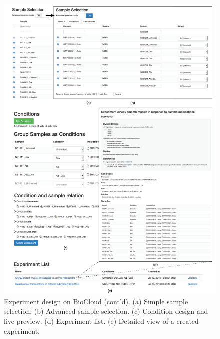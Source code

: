 \begin{figure}[!tbp]
\centering
\includegraphics[width=1\textwidth]{images/biocloud_experiment_sample_condition}
\caption[Experiment design on BioCloud (cont'd)]{
    Experiment design on BioCloud (cont'd).
    (a) Simple sample selection.
    (b) Advanced sample selection.
    (c) Condition design and live preview.
    (d) Experiment list.
    (e) Detailed view of a created experiment.
}
\label{fig:biocloud-experiment-sample-condition}
\end{figure}

